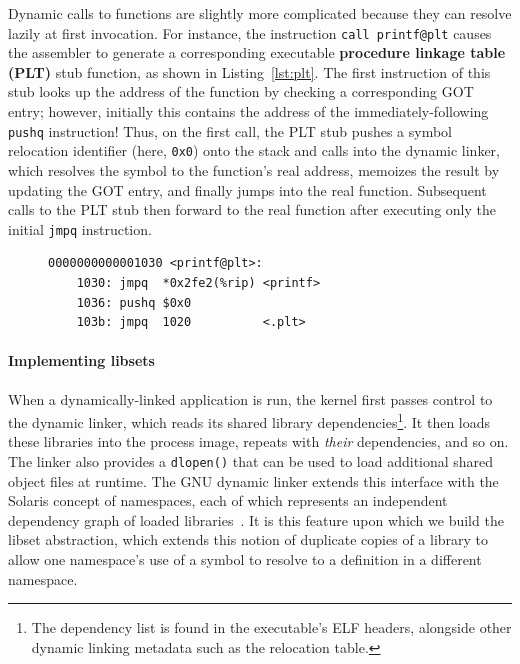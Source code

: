Dynamic calls to functions are slightly more complicated because they can resolve
lazily at first invocation.  For instance, the instruction
\texttt{call~printf@plt} causes the assembler to generate a corresponding executable
\textbf{procedure linkage table (PLT)} stub function, as shown in
Listing~\ref{lst:plt}.  The first instruction of this stub looks up the address of
the
function by checking a corresponding GOT entry; however, initially this contains the
address of the immediately-following \texttt{pushq} instruction!  Thus, on the first
call, the PLT stub pushes a symbol relocation identifier (here, \texttt{0x0}) onto
the stack and calls into the dynamic linker, which resolves the symbol to the
function's real address, memoizes the result by updating the GOT entry, and finally
jumps into the real function.  Subsequent calls to the PLT stub then forward to the
real function after executing only the initial \texttt{jmpq} instruction.

\begin{figure}
\begin{lstlisting}[label=lst:plt,caption=Example PLT entry for call to \texttt{printf()}]
0000000000001030 <printf@plt>:
	1030: jmpq  *0x2fe2(%rip) <printf>
	1036: pushq $0x0
	103b: jmpq  1020          <.plt>
\end{lstlisting}
\end{figure}

\paragraph{Implementing libsets}

When a dynamically-linked application is run, the kernel first passes control to the
dynamic linker, which reads its shared library dependencies\footnote{The dependency
list is found in the executable's ELF headers, alongside other dynamic linking
metadata such as the relocation table.}.  It then loads these libraries into the
process image, repeats with
\textit{their} dependencies, and so on.  The linker also provides a \texttt{dlopen()}
that can be used to load additional shared object files at runtime.  The GNU dynamic
linker extends this interface with the Solaris concept of namespaces, each of which
represents an independent dependency graph of loaded
libraries~\cite{dlmopen-manpage}.  It is this feature upon which we build the libset
abstraction, which extends this notion of duplicate copies of a library to allow one
namespace's use of a symbol to resolve to a definition in a different namespace.

